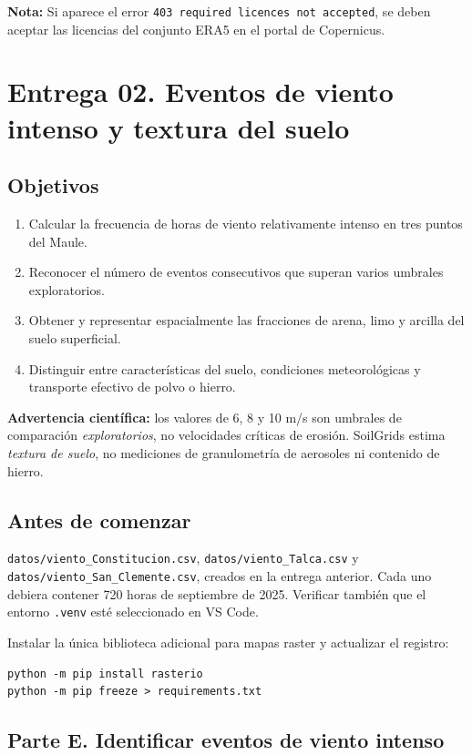 \documentclass[11pt,a4paper]{article}
\begin{document}
\medskip

\noindent
\textbf{Nota:} Si aparece el error
\texttt{403 required licences not accepted},
se deben aceptar las licencias del conjunto ERA5
en el portal de Copernicus.

\clearpage
\section{Entrega 02. Eventos de viento intenso y textura del suelo}

\subsection*{Objetivos}
\begin{enumerate}[label=\arabic*.]
\item Calcular la frecuencia de horas de viento relativamente intenso en tres puntos del Maule.
\item Reconocer el número de eventos consecutivos que superan varios umbrales exploratorios.
\item Obtener y representar espacialmente las fracciones de arena, limo y arcilla del suelo superficial.
\item Distinguir entre características del suelo, condiciones meteorológicas y transporte efectivo de polvo o hierro.
\end{enumerate}

\textbf{Advertencia científica:} los valores de 6, 8 y 10 m/s son umbrales de comparación \emph{exploratorios}, no velocidades críticas de erosión. SoilGrids estima \emph{textura de suelo}, no mediciones de granulometría de aerosoles ni contenido de hierro.

\subsection*{Antes de comenzar}
\texttt{datos/viento\_Constitucion.csv}, \texttt{datos/viento\_Talca.csv} y
\texttt{datos/viento\_San\_Clemente.csv}, creados en la entrega anterior.
Cada uno debiera contener 720 horas de septiembre de 2025. Verificar también
que el entorno \texttt{.venv} esté seleccionado en VS Code.

Instalar la única biblioteca adicional para mapas raster y actualizar el registro:
\begin{lstlisting}
python -m pip install rasterio
python -m pip freeze > requirements.txt
\end{lstlisting}

\subsection{Parte E. Identificar eventos de viento intenso}
\end{document}
